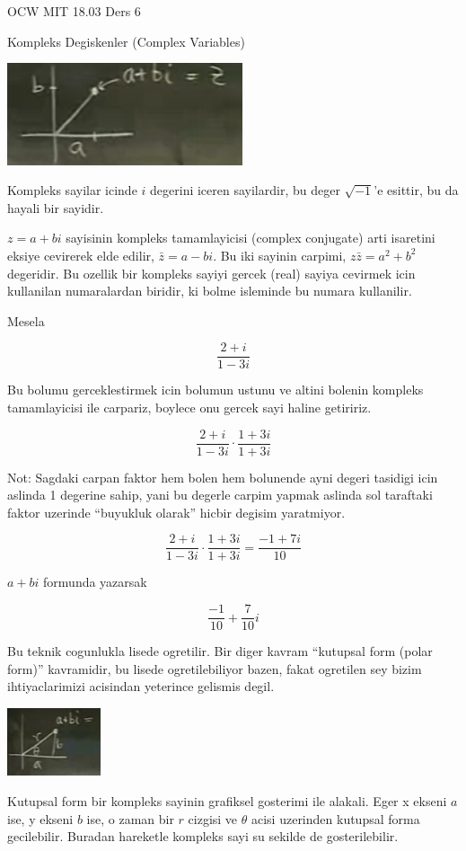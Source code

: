\documentclass[12pt,fleqn]{article}
\begin{document}
OCW MIT 18.03 Ders 6

Kompleks Degiskenler (Complex Variables)

\includegraphics[height=3cm]{6_1.png}

Kompleks sayilar icinde $i$ degerini iceren sayilardir, bu deger
$\sqrt{-1}$'e esittir, bu da hayali bir sayidir. 

$z=a+bi$ sayisinin kompleks tamamlayicisi (complex conjugate) arti
isaretini eksiye cevirerek elde edilir, $\bar{z}=a-bi$. Bu iki sayinin
carpimi, $z\bar{z} = a^2+b^2$ degeridir. Bu ozellik bir kompleks sayiyi
gercek (real) sayiya cevirmek icin kullanilan numaralardan biridir, ki
bolme isleminde bu numara kullanilir.

Mesela

\[ \frac{2+i}{1-3i} \]

Bu bolumu gerceklestirmek icin bolumun ustunu ve altini bolenin kompleks
tamamlayicisi ile carpariz, boylece onu gercek sayi haline getiririz.

\[ \frac{2+i}{1-3i} \cdot \frac{1+3i}{1+3i}\]

Not: Sagdaki carpan faktor hem bolen hem bolunende ayni degeri tasidigi
icin aslinda 1 degerine sahip, yani bu degerle carpim yapmak aslinda sol
taraftaki faktor uzerinde ``buyukluk olarak'' hicbir degisim yaratmiyor.

\[ \frac{2+i}{1-3i} \cdot \frac{1+3i}{1+3i} = \frac{-1+7i}{10}\]


$a+bi$ formunda yazarsak

\[ \frac{-1}{10} + \frac{7}{10}i \]

Bu teknik cogunlukla lisede ogretilir. Bir diger kavram ``kutupsal form
(polar form)'' kavramidir, bu lisede ogretilebiliyor bazen, fakat ogretilen
sey bizim ihtiyaclarimizi acisindan yeterince gelismis degil. 

\includegraphics[height=2cm]{6_2.png}

Kutupsal form bir kompleks sayinin grafiksel gosterimi ile alakali. Eger x
ekseni $a$ ise, y ekseni $b$ ise, o zaman bir $r$ cizgisi ve $\theta$ acisi
uzerinden kutupsal forma gecilebilir. Buradan hareketle kompleks sayi su
sekilde de gosterilebilir. 
\end{document}
